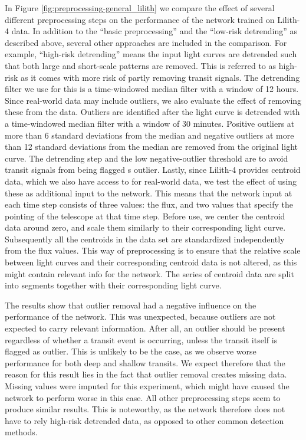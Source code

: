 In Figure \ref{fig:preprocessing-general_lilith} we compare the effect of several different preprocessing steps on the performance of the network trained on Lilith-4 data. In addition to the ``basic preprocessing'' and the ``low-risk detrending'' as described above, several other approaches are included in the comparison. For example, ``high-risk detrending'' means the input light curves are detrended such that both large and short-scale patterns are removed. This is referred to as high-risk as it comes with more risk of partly removing transit signals. The detrending filter we use for this is a time-windowed median filter with a window of 12 hours. Since real-world data may include outliers, we also evaluate the effect of removing these from the data. Outliers are identified after the light curve is detrended with a time-windowed median filter with a window of 30 minutes. Positive outliers at more than 6 standard deviations from the median and negative outliers at more than 12 standard deviations from the median are removed from the original light curve. The detrending step and the low negative-outlier threshold are to avoid transit signals from being flagged s outlier. Lastly, since Lilith-4 provides centroid data, which we also have access to for real-world data, we test the effect of using these as additional input to the network. This means that the network input at each time step consists of three values: the flux, and two values that specify the pointing of the telescope at that time step. Before use, we center the centroid data around zero, and scale them similarly to their corresponding light curve. Subsequently all the centroids in the data set are standardized independently from the flux values. This way of preprocessing is to ensure that the relative scale between light curves and their corresponding centroid data is not altered, as this might contain relevant info for the network. The series of centroid data are split into segments together with their corresponding light curve.

The results show that outlier removal had a negative influence on the performance of the network. This was unexpected, because outliers are not expected to carry relevant information. After all, an outlier should be present regardless of whether a transit event is occurring, unless the transit itself is flagged as outlier. This is unlikely to be the case, as we observe worse performance for both deep and shallow transits. We expect therefore that the reason for this result lies in the fact that outlier removal creates missing data. Missing values were imputed for this experiment, which might have caused the network to perform worse in this case. All other preprocessing steps seem to produce similar results. This is noteworthy, as the network therefore does not have to rely high-risk detrended data, as opposed to other common detection methods. 

